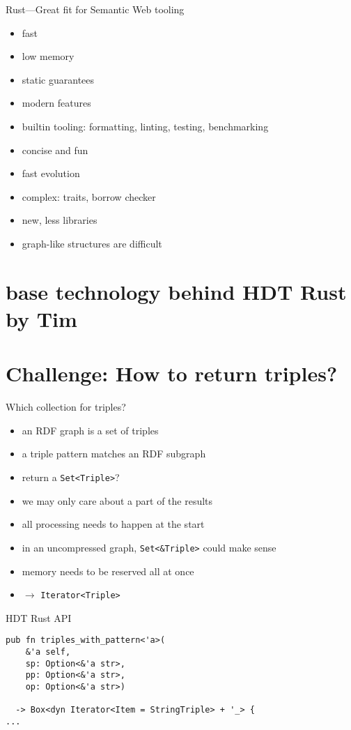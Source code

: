 \documentclass[14pt,aspectratio=169]{beamer}
\newcommand\pro{\item[$+$]}
\newcommand\con{\item[$-$]}
\begin{document}
\begin{frame}{Rust---Great fit for Semantic Web tooling}
\begin{itemize}
\pro fast
\pro low memory
\pro static guarantees
\pro modern features
\pro builtin tooling: formatting, linting, testing, benchmarking
\pro concise and fun
\pro fast evolution
\pause
\con complex: traits, borrow checker
\con new, less libraries
\con graph-like structures are difficult
\end{itemize}
\end{frame}

\section{base technology behind HDT Rust by Tim}

\section{Challenge: How to return triples?}
\begin{frame}{Which collection for triples?}
\begin{itemize}
\item an RDF graph is a set of triples
\item a triple pattern matches an RDF subgraph
\item return a \texttt{Set<Triple>}?
\pause
\con we may only care about a part of the results
\con all processing needs to happen at the start
\item in an uncompressed graph, \texttt{Set<\&Triple>} could make sense
\con memory needs to be reserved all at once
\item $\rightarrow$ \texttt{Iterator<Triple>}
\end{itemize}
\end{frame}

\begin{frame}[fragile]{HDT Rust API}
\small
\begin{verbatim}
pub fn triples_with_pattern<'a>(
    &'a self,
    sp: Option<&'a str>,
    pp: Option<&'a str>,
    op: Option<&'a str>)

  -> Box<dyn Iterator<Item = StringTriple> + '_> {
...
\end{verbatim}
\end{frame}
\end{document}
